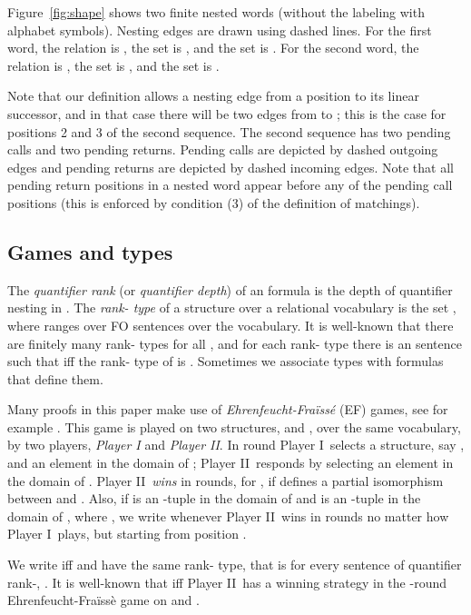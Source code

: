 \documentclass{LMCS}
\newcommand{\dupl}{Player II}
\newcommand{\spoiler}{Player I}
\theoremstyle{plain}
\theoremstyle{definition}
\newcounter{example}
\begin{document}
Figure~\ref{fig:shape} shows two finite nested words (without the
labeling with alphabet symbols).  Nesting edges are drawn using dashed
lines.  For the first word, the relation  is ,
the set  is , and the set  is .
For the second word, the
relation  is , the set  is , and the
set  is .

Note that our definition allows a nesting edge from a position  to
its linear successor, and in that case there will be two edges from
 to ; this is the case for positions 2 and 3 of the second
sequence.  The second sequence has two pending calls and two pending
returns.  Pending calls are depicted by dashed outgoing edges and
pending returns are depicted by dashed incoming edges.  Note that
all pending return positions in a nested word appear before any of the
pending call positions (this is enforced by condition (3) of the
definition of matchings).

\subsection{Games and types}


The {\em quantifier rank} (or {\em quantifier depth}) of
an  formula  is the depth of quantifier nesting in .
The  {\em rank- type} of a structure  over a relational vocabulary
is the set \phik, 
where  ranges over FO sentences over the vocabulary.
It is well-known that there are finitely many rank- types for all
, and  
for each rank- type  there is an  sentence 
 such that  iff
the rank- type of  is . 
Sometimes we 
associate types with formulas that define them.

Many proofs in this paper make use of {\em Ehrenfeucht-Fra\"iss\'e}
(EF) games, see for example \cite{I}. This game is played on two structures,  and ,
over the same vocabulary, by two players, {\em \spoiler} and {\em
\dupl}.  In round  \spoiler\ selects a structure, say , and an
element  in the domain of ; \dupl\ responds by selecting an
element  in the domain of .  \dupl\ {\em wins} in 
rounds, for , if  defines a
partial isomorphism between  and .  Also, if  is an
-tuple in the domain of  and  is an -tuple in the
domain of , where , we write  whenever \dupl\ wins in  rounds no matter how
\spoiler\ plays, but starting from position .

We write  iff  and  have the same
rank- type, that is for every  sentence  of quantifier
rank-, . 
It is well-known that  iff \dupl\ has a
winning strategy in the -round Ehrenfeucht-Fra\"iss\`e game on
 and . 
\end{document}
